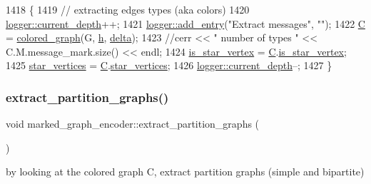 \begin{DoxyCode}
1418 \{
1419   \textcolor{comment}{// extracting edges types (aka colors)}
1420   \hyperlink{classlogger_a9d29b49bd318a719a8e85b59eac54fe0}{logger::current\_depth}++;
1421   \hyperlink{classlogger_a710163deb17bc81f70d53d285b8ac9ac}{logger::add\_entry}(\textcolor{stringliteral}{"Extract messages"}, \textcolor{stringliteral}{""});
1422   \hyperlink{classmarked__graph__encoder_af82bc0653414091291cb75553a407bdb}{C} = \hyperlink{classcolored__graph}{colored\_graph}(G, \hyperlink{classmarked__graph__encoder_ae7f8872c57d2d64e4ca6cc47387b9b58}{h}, \hyperlink{classmarked__graph__encoder_a29dcf42526b12cf7964a556bb1025c9b}{delta});
1423   \textcolor{comment}{//cerr << " number of types " << C.M.message\_mark.size() << endl;}
1424   \hyperlink{classmarked__graph__encoder_ac36f6c2430af6fa4d20584569859bb59}{is\_star\_vertex} = \hyperlink{classmarked__graph__encoder_af82bc0653414091291cb75553a407bdb}{C}.\hyperlink{classcolored__graph_ad41163e970530c7e45878d299f0dc961}{is\_star\_vertex};
1425   \hyperlink{classmarked__graph__encoder_a08fdf6fcd7dcd8c5d1667f2d7ff06c2c}{star\_vertices} = \hyperlink{classmarked__graph__encoder_af82bc0653414091291cb75553a407bdb}{C}.\hyperlink{classcolored__graph_ab7ee8d717abde7ad7467ef695038f574}{star\_vertices};
1426   \hyperlink{classlogger_a9d29b49bd318a719a8e85b59eac54fe0}{logger::current\_depth}--;
1427 \}
\end{DoxyCode}
\mbox{\label{classmarked__graph__encoder_a60b0038c57bd8fa2f5cb3f0b6999c4f3}} 
\subsubsection{\texorpdfstring{extract\+\_\+partition\+\_\+graphs()}{extract\_partition\_graphs()}}
{\footnotesize\ttfamily void marked\+\_\+graph\+\_\+encoder\+::extract\+\_\+partition\+\_\+graphs (\begin{DoxyParamCaption}{ }\end{DoxyParamCaption})\hspace{0.3cm}{\ttfamily [private]}}



by looking at the colored graph C, extract partition graphs (simple and bipartite) 


